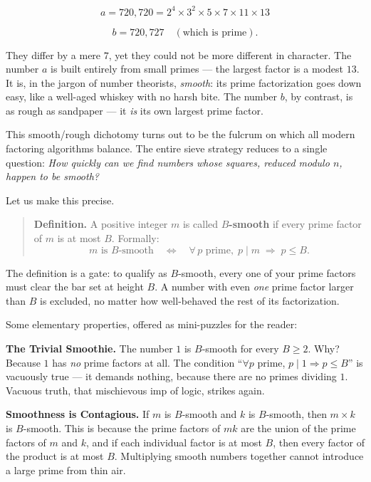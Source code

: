 \[a = 720{,}720 = 2^4 \times 3^2 \times 5 \times 7 \times 11 \times 13\]

\[b = 720{,}727 \quad (\text{which is prime}).\]

They differ by a mere \(7\), yet they could not be more different in character. The number \(a\) is built entirely from small primes --- the largest factor is a modest \(13\). It is, in the jargon of number theorists, \emph{smooth}: its prime factorization goes down easy, like a well-aged whiskey with no harsh bite. The number \(b\), by contrast, is as rough as sandpaper --- it \emph{is} its own largest prime factor.

This smooth/rough dichotomy turns out to be the fulcrum on which all modern factoring algorithms balance. The entire sieve strategy reduces to a single question: \emph{How quickly can we find numbers whose squares, reduced modulo \(n\), happen to be smooth?}

Let us make this precise.

\begin{quote}
\textbf{Definition.} A positive integer \(m\) is called \textbf{\(B\)-smooth} if every prime factor of \(m\) is at most \(B\). Formally: \[m \text{ is } B\text{-smooth} \quad\Longleftrightarrow\quad \forall\, p \text{ prime},\; p \mid m \;\Rightarrow\; p \leq B.\]
\end{quote}

The definition is a gate: to qualify as \(B\)-smooth, every one of your prime factors must clear the bar set at height \(B\). A number with even \emph{one} prime factor larger than \(B\) is excluded, no matter how well-behaved the rest of its factorization.

Some elementary properties, offered as mini-puzzles for the reader:

\textbf{The Trivial Smoothie.} The number \(1\) is \(B\)-smooth for every \(B \geq 2\). Why? Because \(1\) has \emph{no} prime factors at all. The condition ``\(\forall p\) prime, \(p \mid 1 \Rightarrow p \leq B\)'' is vacuously true --- it demands nothing, because there are no primes dividing \(1\). Vacuous truth, that mischievous imp of logic, strikes again.

\textbf{Smoothness is Contagious.} If \(m\) is \(B\)-smooth and \(k\) is \(B\)-smooth, then \(m \times k\) is \(B\)-smooth. This is because the prime factors of \(mk\) are the union of the prime factors of \(m\) and \(k\), and if each individual factor is at most \(B\), then every factor of the product is at most \(B\). Multiplying smooth numbers together cannot introduce a large prime from thin air.


